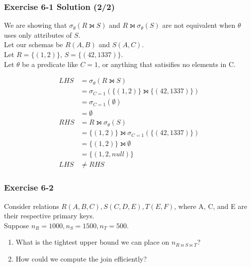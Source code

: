 \begin{frame}
\frametitle{Exercise 6-1 Solution (2/2)}

We are showing that $\sigma_{\theta}(R \leftouterjoin S)$ and $R \leftouterjoin \sigma_{\theta}(S)$ are not equivalent when $\theta$ uses only attributes of $S$. \\
Let our schemas be $R(A,B)$ and $S(A,C)$. \\
Let $R = \{(1, 2)\}$, $S = \{(42, 1337)\}$. \\
Let $\theta$ be a predicate like $C = 1$, or anything that satisifies no elements in C.

\begin{align*}
  LHS &= \sigma_{\theta}(R \leftouterjoin S) \\
  &= \sigma_{C=1}(\{(1, 2)\} \leftouterjoin \{(42, 1337)\}) \\
  &= \sigma_{C=1}(\emptyset) \\
  &= \emptyset \\
  RHS &= R \leftouterjoin \sigma_{\theta}(S) \\
  &= \{(1, 2)\} \leftouterjoin \sigma_{C=1}(\{(42, 1337)\}) \\
  &= \{(1, 2)\} \leftouterjoin \emptyset \\
  &= \{(1, 2, null)\} \\
  LHS & \neq RHS
\end{align*}
\end{frame}


\begin{frame}
\frametitle{Exercise 6-2}

Consider relations $R(A, B, C), S(C, D, E), T(E, F)$, where A, C, and E are their respective primary keys. \\

Suppose $n_R = 1000, n_S = 1500, n_T = 500$.


\begin{enumerate}
  \item What is the tightest upper bound we can place on $n_{ R \bowtie S \bowtie T }$?
  \item How could we compute the join efficiently?
\end{enumerate}
\end{frame}


